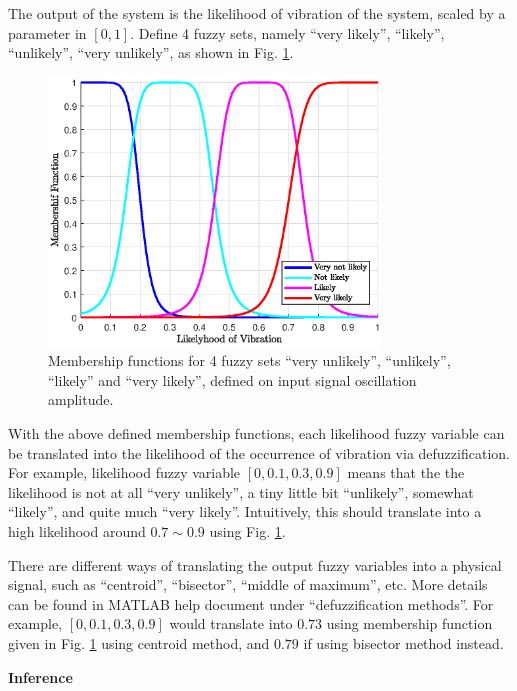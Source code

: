 The output of the system is the likelihood of vibration of the system, scaled by a parameter in $[0, 1]$. Define 4 fuzzy sets, namely ``very likely'', ``likely'', ``unlikely'', ``very unlikely'', as shown in Fig. \ref{ch:fcs:fig:exp_vibration_detection_mf_likelihood}.

\begin{figure}
	\centering
	\includegraphics[width=250pt]{chapters/ch-fuzzy-control-system/figures/exp_vibration_detection_mf_likelihood.eps}
	\caption{Membership functions for 4 fuzzy sets ``very unlikely'', ``unlikely'', ``likely'' and ``very likely'', defined on input signal oscillation amplitude.}
	\label{ch:fcs:fig:exp_vibration_detection_mf_likelihood}
\end{figure}

With the above defined membership functions, each likelihood fuzzy variable can be translated into the likelihood of the occurrence of vibration via defuzzification. For example, likelihood fuzzy variable $[0, 0.1, 0.3, 0.9]$ means that the the likelihood is not at all ``very unlikely'', a tiny little bit ``unlikely'', somewhat ``likely'', and quite much ``very likely''. Intuitively, this should translate into a high likelihood around $0.7\sim 0.9$ using Fig. \ref{ch:fcs:fig:exp_vibration_detection_mf_likelihood}.

There are different ways of translating the output fuzzy variables into a physical signal, such as ``centroid'', ``bisector'', ``middle of maximum'', etc. More details can be found in MATLAB help document under ``defuzzification methods''. For example, $[0, 0.1, 0.3, 0.9]$ would translate into $0.73$ using membership function given in Fig. \ref{ch:fcs:fig:exp_vibration_detection_mf_likelihood} using centroid method, and $0.79$ if using bisector method instead.

\vspace{0.1in}
\noindent \textbf{Inference}
\vspace{0.1in}

